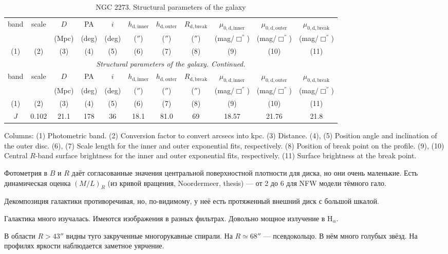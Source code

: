 \documentclass[english,10pt]{article}
\def\mm{\mathrm}
\begin{document}
\begin{longtable}[c]{ccccccccccc}
\caption{NGC 2273. Structural parameters of the galaxy} \\ 
\hline 
band & scale & $D$   & PA    & $i$ &
$h_\mm{d,inner}$ & $h_\mm{d,outer}$ & $R_\mm{d,break}$ &
$\mu_\mm{0,d,inner}$ & $\mu_\mm{0,d,outer}$ & $\mu_\mm{0,d,break}$ \\ 
     &       & (Mpc) & (deg) & (deg) &
($''$)           & ($''$)           & ($''$)           & 
(mag/$\Box^{''}$)    & (mag/$\Box^{''}$)    & (mag/$\Box^{''}$) \\
(1)&(2)&(3)&(4)&(5)&(6)&(7)&(8)&(9)&(10)&(11) \\ 
\hline
\endfirsthead 
\hline
\multicolumn{11}{c}{\small\slshape Structural parameters of the galaxy. 
Continued. } \\ \hline
band & scale & $D$   & PA    & $i$ &
$h_\mm{d,inner}$ & $h_\mm{d,outer}$ & $R_\mm{d,break}$ &
$\mu_\mm{0,d,inner}$ & $\mu_\mm{0,d,outer}$ & $\mu_\mm{0,d,break}$ \\ 
     &       & (Mpc) & (deg) & (deg) &
($''$)           & ($''$)           & ($''$)           & 
(mag/$\Box^{''}$)    & (mag/$\Box^{''}$)    & (mag/$\Box^{''}$) \\
(1)&(2)&(3)&(4)&(5)&(6)&(7)&(8)&(9)&(10)&(11) \\
\hline
\endhead 
\hline
$J$ & 0.102 & 21.1 & 178 & 36 & 
18.1 & 81.0 & 69 & 
18.57 & 21.76 & 21.8 \tabularnewline
\hline
\end{longtable}

Columns: 
(1) Photometric band. 
(2) Conversion factor to convert arcsecs into kpc.
(3) Distance.
(4), (5) Position angle and inclination of the outer disc.
(6), (7) Scale length for the inner and outer exponential fits, 
respectively. 
(8) Position of break point on the profile. 
(9), (10) Central $R$-band surface brightness 
for the inner and outer exponential fits, respectively. 
(11) Surface brightness at the break point.

\bigskip
\noindent
Фотометрия в $B$ и $R$ даёт согласованные значения центральной 
поверхностной плотности для диска, но они очень маленькие. Есть 
динамическая оценка $(M/L)_R$ 
(из кривой вращения, Noordermeer, thesis) --- от 2 до 6 для NFW 
модели тёмного гало.

\bigskip
\noindent
Декомпозиция галактики противоречивая, но, по-видимому, у неё есть 
протяженный внешний диск с большой шкалой.

\bigskip
\noindent
Галактика много изучалась. Имеются изображения в разных фильтрах. 
Довольно мощное излучение в H$_\alpha$.

\bigskip
\noindent
В области $R > 43''$ видны туго закрученные многорукавные спирали. 
На $R \simeq 68''$ --- псевдокольцо. В нём много голубых звёзд. 
На профилях яркости наблюдается заметное уярчение.
\end{document}
